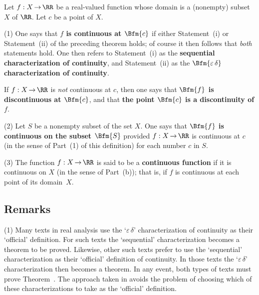 \V

        Let $f:X \,{\rightarrow}\, {\RR}$ be a real-valued function whose domain is a (nonempty) subset $X$ of ${\RR}$. Let $c$ be a point of $X$.

\V

        (1) One says that {\bf $f$ is continuous at $\Bfm{c}$} if either Statement~(i) or Statement~(ii) of the preceding theorem holds;
    of course it then follows that {\em both} statements hold.
    One then refers to Statement~(i) as the {\bf sequential characterization of continuity},
    and Statement~(ii) as the {\bf $\Bfm{{\varepsilon}\,{\delta}}$ characterization of continuity}.

        If $f:X \,{\rightarrow}\, {\RR}$ is {\em not} continuous at $c$, then one says that {\bf $\Bfm{f}$ is discontinuous at $\Bfm{c}$},
    and that {\bf the point $\Bfm{c}$ is a discontinuity of $f$}.

\V

        (2) Let $S$ be a nonempty subset of the set $X$.
    One says that {\bf $\Bfm{f}$ is continuous on the subset $\Bfm{S}$}
    provided $f:X \,{\rightarrow}\, {\RR}$ is continuous at $c$ (in the sense of Part~(1) of this definition) for each number $c$ in $S$.

\V

        (3) The function $f:X \,{\rightarrow}\, {\RR}$ is said to be a {\bf continuous function}
    if it is continuous on $X$ (in the sense of Part~(b)); that is, if $f$ is continuous at each point of its domain~$X$.

\VV

            \subsection{\small{\bf Remarks}}
            \label{RemrkD20.50}

\hspace*{\parindent}(1) Many texts in real analysis use the `${\varepsilon}\,{\delta}$' characterization of continuity as their `official' definition.
    For such texts the `sequential' characterization becomes a theorem to be proved.
    Likewise, other such texts prefer to use the `sequential' characterization as their `official' definition of continuity.
    In those texts the `${\varepsilon}\,{\delta}$' characterization then becomes a theorem. In any event, both types of texts must prove Theorem~. 
    The approach taken in {\ThisText} avoids the problem of choosing which of these characterizations to take as the `official' definition.

